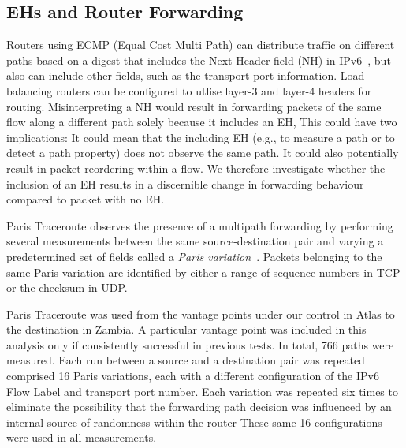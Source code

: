 \documentclass[conference]{IEEEtran}
\begin{document}
\subsection{EHs and Router Forwarding}

Routers using ECMP
(Equal Cost Multi Path) can distribute traffic on different paths based on
a digest that includes the Next Header field (NH) in
IPv6~\cite{lb-classification}, but also can include other fields, such as the 
transport port information. Load-balancing routers can be configured to utlise
layer-3 and layer-4 headers for routing. 
Misinterpreting a NH would result in forwarding
packets of the same flow along a different path solely because it
includes an EH, This could have two implications: It could mean that
the including EH (e.g., to measure a path or to detect a path property)
does not observe the same path. It could also potentially result in
packet reordering within a flow. 
We therefore investigate whether the inclusion of an EH results in a
discernible change in forwarding behaviour compared to packet with no EH.


% 


Paris Traceroute observes the presence of a multipath forwarding by 
performing several measurements between the same
source-destination pair and varying a predetermined set of fields called a
\textit{Paris variation}~\cite{augustin2006avoiding}.  Packets belonging to the
same Paris variation are identified by either a range of sequence numbers in
TCP or the checksum in UDP.


Paris Traceroute was used from the vantage points under our control in Atlas to
the destination in Zambia.  A  particular vantage point was included in this
analysis only if consistently successful in previous tests.  In total, 766
paths were measured.  Each run between a source and a destination pair was
repeated comprised 16 Paris variations, each with a different configuration of
the IPv6 Flow Label and transport port number.  Each variation was repeated six
times to eliminate the possibility that the forwarding path decision was
influenced by an internal source of randomness within the router These same 16
configurations were used in all measurements. 
\end{document}

